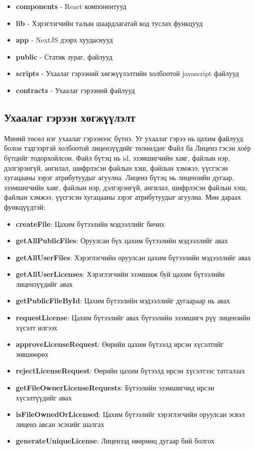 \begin{itemize}
	\item \textbf{components} - React компонентууд
	\item \textbf{lib} - Хэрэглэгчийн талын шаардлагатай код туслах функцууд
	\item \textbf{app} - NextJS дээрх хуудаснууд
	\item \textbf{public} - Статик зураг, файлууд
	\item \textbf{scripts} - Ухаалаг гэрээний хөгжүүлэлтийн холбоотой  javascript файлууд
	\item \textbf{contracts} - Ухаалаг гэрээний файлууд
\end{itemize}

\subsection{Ухаалаг гэрээн хөгжүүлэлт}
Миний төсөл нэг ухаалаг гэрээнээс бүтнэ. Уг ухаалаг гэрээ нь цахим файлууд болон тэдгээртэй холбоотой лицензүүдийг төлөөлдөг Файл ба Лиценз гэсэн хоёр бүтцийг тодорхойлсон.
Файл бүтэц  нь id, эзэмшигчийн хаяг, файлын нэр, дэлгэрэнгүй, ангилал, шифрлэсэн файлын хэш, файлын хэмжээ, үүсгэсэн хугацааны зэрэг атрибутуудыг агуулна.
Лиценз бүтэц нь лицензийн дугаар, эзэмшигчийн хаяг, файлын нэр, дэлгэрэнгүй, ангилал, шифрлэсэн файлын хэш, файлын хэмжээ, үүсгэсэн хугацааны  зэрэг атрибутуудыг агуулна.
Мөн дараах функцүүдтэй:

\begin{itemize}
	\item \textbf{createFile}: Цахим бүтээлийн мэдээллийг бичих
	\item \textbf{getAllPublicFiles}: Оруулсан бүх цахим бүтээлийн мэдээллийг авах
	\item \textbf{getAllUserFiles}:  Хэрэглэгчийн оруулсан цахим бүтээлийн мэдээллийг авах
	\item \textbf{getAllUserLicenses}: Хэрэглэгчийн эзэмшиж буй цахим бүтээлийн лицензүүдийг авах
	\item \textbf{getPublicFileById}: Цахим бүтээлийн мэдээллийг дугаараар нь авах
	\item \textbf{requestLicense}: Цахим бүтээлийг авах бүтээлийн эзэмшигч рүү лицензийн хүсэлт илгээх
	\item \textbf{approveLicenseRequest}: Өөрийн цахим бүтээлд ирсэн хүсэлтийг зөвшөөрөх
	\item \textbf{rejectLicenseRequest}: Өөрийн цахим бүтээлд ирсэн хүсэлтээс татгалзах
	\item \textbf{getFileOwnerLicenseRequests}: Бүтээлийн эзэмшигчид ирсэн хүсэлтүүдийг авах
	\item \textbf{isFileOwnedOrLicensed}: Цахим бүтээлийг хэрэглэгчийн оруулсан эсвэл лиценз авсан эсэхийг шалгах
	\item \textbf{generateUniqueLicense}: Лицензэд өвөрмөц дугаар бий болгох
\end{itemize}

